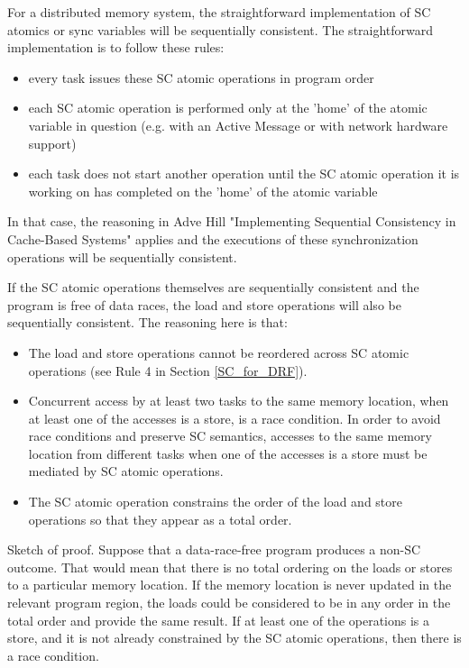 For a distributed memory system, the straightforward implementation of SC
atomics or sync variables will be sequentially consistent. The straightforward
implementation is to follow these rules:

\begin{itemize}

 \item every task issues these SC atomic operations in program order

 \item each SC atomic operation is performed only at the 'home' of the atomic
 variable in question (e.g. with an Active Message or with network hardware
 support)

 \item each task does not start another operation until the SC atomic operation
 it is working on has completed on the 'home' of the atomic variable

\end{itemize}

In that case, the reasoning in Adve Hill "Implementing Sequential Consistency
in Cache-Based Systems" applies and the executions of these synchronization
operations will be sequentially consistent.

If the SC atomic operations themselves are sequentially consistent and the
program is free of data races, the load and store operations will also be
sequentially consistent. The reasoning here is that:

\begin{itemize}

 \item The load and store operations cannot be reordered across SC atomic
 operations (see Rule 4 in Section \ref{SC_for_DRF}).

 \item Concurrent access by at least two tasks to the same memory location,
 when at least one of the accesses is a store, is a race condition. In order to
 avoid race conditions and preserve SC semantics, accesses to the same memory
 location from different tasks when one of the accesses is a store must be
 mediated by SC atomic operations.

 \item The SC atomic operation constrains the order of the load and store
 operations so that they appear as a total order.
\end{itemize}

Sketch of proof. Suppose that a data-race-free program produces a non-SC
outcome. That would mean that there is no total ordering on the loads or stores
to a particular memory location. If the memory location is never updated in the
relevant program region, the loads could be considered to be in any order in
the total order and provide the same result. If at least one of the operations
is a store, and it is not already constrained by the SC atomic operations, then
there is a race condition.

